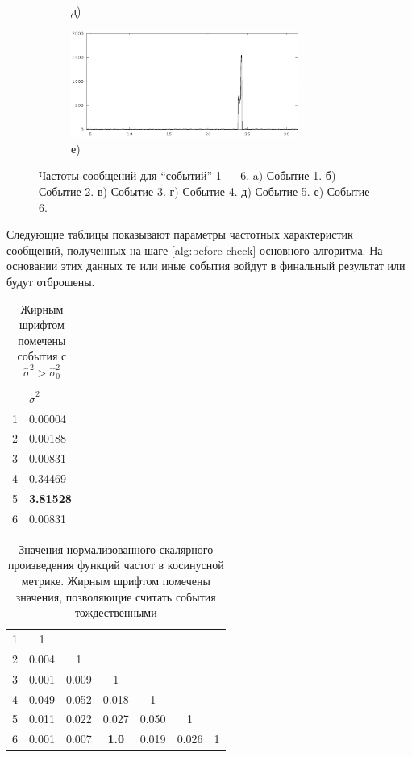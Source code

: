 \documentclass[12pt, a4paper]{article}
\newcommand\todo[1]{\marginpar{\textcolor{red}{#1}}}
\begin{document}
\begin{figure}[H]
\begin{subfigure}[b]{0.45 \textwidth}
		\caption*{д)}
	\end{subfigure}  
	\begin{subfigure}[b]{0.45 \textwidth}
		\centering
		\includegraphics[width=7.5cm]{all-freq-23-20.eps}	
		\caption*{е)}
	\end{subfigure}  
	
	\caption{Частоты сообщений для ``событий'' 1 --- 6. a) Событие 1. б) Событие 2. в) Событие 3. г) Событие 4. д) Событие 5. е) Событие 6.}
	\end{figure}	  
	  
	Следующие таблицы показывают параметры частотных характеристик сообщений, полученных на шаге \ref{alg:before-check} основного алгоритма. На основании этих данных те или иные события войдут в финальный результат или будут отброшены.
	
	\begin{table}[H]
	\centering
	\caption{Жирным шрифтом помечены события с $\hat{\sigma}^2>\hat{\sigma}_0^2$}
	\begin{tabular}{l | l}
	& $\hat{\sigma}^2$ \\ 
	1 & 0.00004 \\ 
	2 & 0.00188 \\ 
	3 & 0.00831 \\ 
	4 & 0.34469 \\ 
	5 & \textbf{3.81528} \\ 
	6 & 0.00831 \\ 
	\end{tabular}
	
	\label{sd-table}
	\end{table}
	
	
	\begin{table}[H]
	\centering
	\caption{Значения нормализованного скалярного произведения функций частот в косинусной метрике. Жирным шрифтом помечены значения, позволяющие считать события тождественными}
	\begin{tabular}{ r | c  c  c  c  c  c }
		1 & 1 & & & & & \\
		2 & 0.004 & 1 & & & & \\ 
		3 & 0.001 & 0.009 & 1 & & & \\ 
		4 & 0.049 & 0.052 & 0.018 & 1 & & \\
		5 & 0.011 & 0.022 & 0.027 & 0.050 & 1 & \\
		6 & 0.001 & 0.007 & \textbf{1.0} & 0.019 & 0.026 & 1 \\
	\end{tabular}
	
	\label{dotprod-table}
	\end{table}
	
\end{document}
